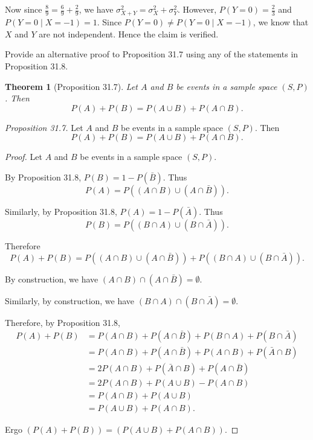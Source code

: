 \documentclass{article}
\newtheorem*{theorem}{Theorem}
\theoremstyle{definition}
\begin{document}
Now since $\frac{8}{9}=\frac{6}{9}+\frac{2}{9}$, we have $\sigma_{X+Y}^2=\sigma_X^2+\sigma_Y^2$. However, $P(Y=0)=\frac{2}{3}$ and  $P(Y=0\mid X=-1)=1$. Since $P(Y=0)\neq P(Y=0\mid X=-1)$, we know that $X$ and $Y$ are not independent. Hence the claim is verified.\\
\begin{question}
    Provide an alternative proof to Proposition 31.7 using any of the statements in Proposition 31.8.
    \begin{theorem}[Proposition 31.7]
    Let $A$ and $B$ be events in a sample space $(S, P)$. Then 
    \[ P(A) + P(B) = P(A\cup B) + P(A\cap B).\]
    \end{theorem}
\end{question}
\begin{solution}
\newline

\noindent\textit{Proposition 31.7. }Let $A$ and $B$ be events in a sample space $(S,P)$. Then \[P(A)+P(B)=P(A\cup B)+P(A\cap B).\]
\begin{proof}Let $A$ and $B$ be events in a sample space $(S,P)$.

By Proposition 31.8, $P(B)=1-P(\bar{B})$. Thus \[P(A)=P\left((A\cap B)\cup(A\cap\bar{B})\right).\]

Similarly, by Proposition 31.8, $P(A)=1-P(\bar{A})$. Thus \[P(B)=P\left((B\cap A)\cup(B\cap\bar{A})\right).\]

Therefore \[P(A)+P(B)=P\left((A\cap B)\cup(A\cap\bar{B})\right)+P\left((B\cap A)\cup(B\cap\bar{A})\right).\]

By construction, we have $(A\cap B)\cap(A\cap\bar{B})=\emptyset$.

Similarly, by construction, we have $(B\cap A)\cap(B\cap\bar{A})=\emptyset$.

Therefore, by Proposition 31.8,
\begin{align*}
P(A)+P(B)
&=P(A\cap B)+P(A\cap\bar{B})+P(B\cap A)+P(B\cap\bar{A})\\
&=P(A\cap B)+P(A\cap\bar{B})+P(A\cap B)+P(\bar{A}\cap B)\\
&=2P(A\cap B)+P(\bar{A}\cap B)+P(A\cap\bar{B})\\
&=2P(A\cap B)+P(A\cup B)-P(A\cap B)\\
&=P(A\cap B)+P(A\cup B)\\
&=P(A\cup B)+P(A\cap B).
\end{align*}

Ergo $\left(P(A)+P(B)\right)=\left(P(A\cup B)+P(A\cap B)\right)$.
\end{proof}
\end{solution}
\end{document}

